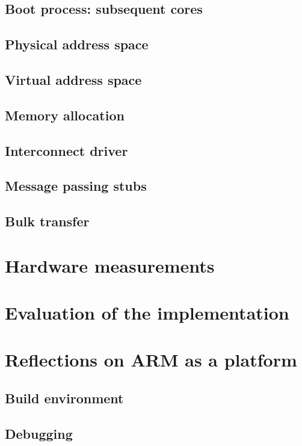 \documentclass[a4paper,twoside]{report} %
\begin{document}
\section{Boot process: subsequent cores}

\section{Physical address space}

\section{Virtual address space}

\section{Memory allocation}

\section{Interconnect driver}\label{sec:interconnect}

\section{Message passing stubs}

\section{Bulk transfer}

\chapter{Hardware measurements}\label{chap:bench}

\chapter{Evaluation of the implementation}\label{chap:eval}

\chapter{Reflections on ARM as a platform}\label{chap:refl}

\section{Build environment}

\section{Debugging}~\label{debugging}

 

\end{document}
